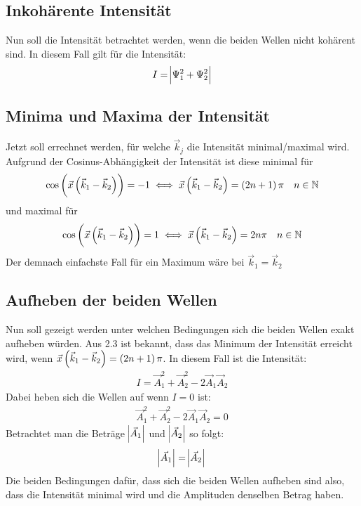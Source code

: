 \subsection{Inkohärente Intensität}
Nun soll die Intensität betrachtet werden, wenn die beiden Wellen nicht kohärent sind. In diesem Fall gilt für die Intensität:
\begin{align*}
	I=\abs{\Psi_1^2+\Psi_2^2}
\end{align*}

\subsection{Minima und Maxima der Intensität}
Jetzt soll errechnet werden, für welche $\vec{k}_j$ die Intensität minimal/maximal wird. Aufgrund der Cosinus-Abhängigkeit der Intensität ist diese minimal für
\begin{align*}
	\cos\del{\vec{x}\del{\vec{k}_1-\vec{k}_2}}=-1\iff\vec{x}\del{\vec{k}_1-\vec{k}_2}=\del{2n+1}\pi&& n\in \mathbb N
\end{align*}
und maximal für
\begin{align*}
	\cos\del{\vec{x}\del{\vec{k}_1-\vec{k}_2}}=1\iff\vec{x}\del{\vec{k}_1-\vec{k}_2}=2n\pi&& n\in\mathbb N
\end{align*}
Der demnach einfachste Fall für ein Maximum wäre bei $\vec{k}_1=\vec{k}_2$

\subsection{Aufheben der beiden Wellen}

Nun soll gezeigt werden unter welchen Bedingungen sich die beiden Wellen exakt aufheben würden. Aus 2.3 ist bekannt, dass das Minimum der Intensität erreicht wird, wenn $\vec{x}\del{\vec{k}_1-\vec{k}_2}=\del{2n+1}\pi$. In diesem Fall ist die Intensität:
\begin{align*}
	I=\vec{A}_1^2+\vec{A}_2^2-2\vec{A}_1\vec{A}_2
\end{align*}
Dabei heben sich die Wellen auf wenn $I=0$ ist:
\begin{align*}
	\vec{A}_1^2+\vec{A}_2^2-2\vec{A}_1\vec{A}_2=0
\end{align*}
Betrachtet man die Beträge $\abs{\vec{A}_1}$ und $\abs{\vec{A}_2}$ so folgt:
\begin{align*}
	\abs{\vec{A}_1}=\abs{\vec{A}_2}
\end{align*}
Die beiden Bedingungen dafür, dass sich die beiden Wellen aufheben sind also, dass die Intensität minimal wird und die Amplituden denselben Betrag haben.


